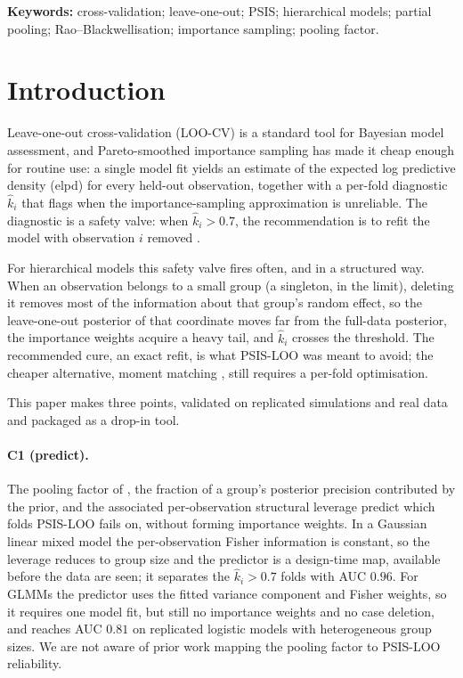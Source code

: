 \documentclass[11pt]{article}
\newcommand{\khat}{\hat{k}}
\begin{document}
\noindent\textbf{Keywords:} cross-validation; leave-one-out; PSIS; hierarchical
models; partial pooling; Rao--Blackwellisation; importance sampling; pooling factor.

\section{Introduction}

Leave-one-out cross-validation (LOO-CV) is a standard tool for Bayesian model
assessment, and Pareto-smoothed importance sampling
\citep[PSIS-LOO;][]{vehtari2017practical, vehtari2024pareto} has made it cheap
enough for routine use: a single model fit yields an estimate of the expected
log predictive density (elpd) for every held-out observation, together with a
per-fold diagnostic $\khat_i$ that flags when the importance-sampling
approximation is unreliable. The diagnostic is a safety valve: when
$\khat_i > 0.7$, the recommendation is to refit the model with observation
$i$ removed \citep{vehtari2017practical}.

For hierarchical models this safety valve fires often, and in a structured way.
When an observation belongs to a small group (a singleton, in the limit), deleting
it removes most of the information about that group's random effect, so the
leave-one-out posterior of that coordinate moves far from the full-data posterior,
the importance weights acquire a heavy tail, and $\khat_i$ crosses the threshold.
The recommended cure, an exact refit, is what PSIS-LOO was meant to avoid; the
cheaper alternative, moment matching \citep{paananen2021implicitly}, still requires
a per-fold optimisation.

This paper makes three points, validated on replicated simulations and real data
and packaged as a drop-in tool.

\paragraph{C1 (predict).} The pooling factor of \citet{gelman2006weakly}, the
fraction of a group's posterior precision contributed by the prior, and the
associated per-observation structural leverage predict which folds PSIS-LOO fails
on, without forming importance weights. In a Gaussian linear mixed model the
per-observation Fisher information is constant, so the leverage reduces to group
size and the predictor is a design-time map, available before the data are seen; it
separates the $\khat_i>0.7$ folds with AUC $0.96$. For GLMMs the predictor uses the
fitted variance component and Fisher weights, so it requires one model fit, but
still no importance weights and no case deletion, and reaches AUC $0.81$ on
replicated logistic models with heterogeneous group sizes. We are not aware of prior
work mapping the pooling factor to PSIS-LOO reliability.
\end{document}
